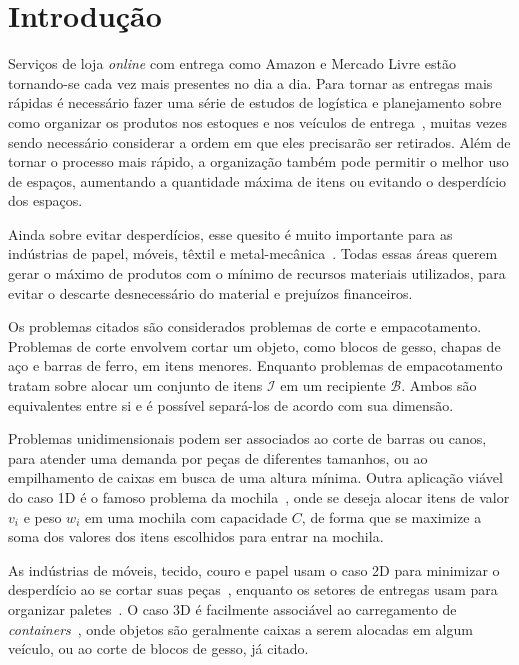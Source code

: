 \chapter*[Introdução]{Introdução}\label{ch:introducao}

Serviços de loja \textit{online} com entrega como Amazon e Mercado Livre estão tornando-se cada vez
mais presentes no dia a dia.
Para tornar as entregas mais rápidas é necessário fazer uma série de estudos de logística e
planejamento sobre como organizar os produtos nos estoques e nos veículos de entrega~\cite{
    silva2022integer,morabito1992abordagem}, muitas vezes sendo necessário considerar a ordem
em que eles precisarão ser retirados.
Além de tornar o processo mais rápido, a organização também pode permitir o melhor uso de espaços,
aumentando a quantidade máxima de itens ou evitando o desperdício dos espaços.

Ainda sobre evitar desperdícios, esse quesito é muito importante para as indústrias de papel,
móveis, têxtil e metal-mecânica~\cite{queiroz2022estudo,cavali2004problemas,belluzzo2005otimizacao}.
Todas essas áreas querem gerar o máximo de produtos com o mínimo de recursos materiais utilizados,
para evitar o descarte desnecessário do material e prejuízos financeiros.

Os problemas citados são considerados problemas de corte e empacotamento.
Problemas de corte envolvem cortar um objeto, como blocos de gesso, chapas de aço e barras de ferro,
em itens menores.
Enquanto problemas de empacotamento tratam sobre alocar um conjunto de itens $\mathcal{I}$ em um
recipiente $\mathcal{B}$.
Ambos são equivalentes entre si e é possível separá-los de acordo com sua dimensão.

Problemas unidimensionais podem ser associados ao corte de barras ou canos, para atender uma
demanda por peças de diferentes tamanhos, ou ao empilhamento de caixas em busca de uma altura mínima.
Outra aplicação viável do caso 1D é o famoso problema da mochila~\cite{exact-solution-techniques},
onde se deseja alocar itens de valor $v_i$ e peso $w_i$ em uma mochila com capacidade $C$,
de forma que se maximize a soma dos valores dos itens escolhidos para entrar na mochila.

As indústrias de móveis, tecido, couro e papel usam o caso 2D para minimizar o desperdício ao se
cortar suas peças~\cite{queiroz2022estudo, cavali2004problemas, belluzzo2005otimizacao},
enquanto os setores de entregas usam para organizar paletes~\cite{morabito1992abordagem}.
O caso 3D é facilmente associável ao carregamento de \textit{containers}~\cite{morabito1992abordagem},
onde objetos são geralmente caixas a serem alocadas em algum veículo, ou ao corte de blocos de
gesso, já citado.

